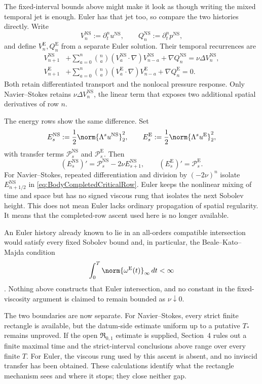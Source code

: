 The fixed-interval bounds above might make it look as though writing the mixed temporal
jet is enough.  Euler has that jet too, so compare the two histories directly.  Write
\[
  V_n^{\mathrm{NS}}:=\partial_t^nu^{\mathrm{NS}},
  \qquad
  Q_n^{\mathrm{NS}}:=\partial_t^np^{\mathrm{NS}},
\]
and define \(V_n^{\mathrm E},Q_n^{\mathrm E}\) from a separate Euler solution.  Their
temporal recurrences are
\begin{align}
  V_{n+1}^{\mathrm{NS}}
  &+
  \sum_{a=0}^{n}\binom{n}{a}
  (V_a^{\mathrm{NS}}\cdot\nabla)V_{n-a}^{\mathrm{NS}}
  +\nabla Q_n^{\mathrm{NS}}
  =\nu\Delta V_n^{\mathrm{NS}},
  \label{eq:NSTemporalRecurrenceComparison}
  \\
  V_{n+1}^{\mathrm E}
  &+
  \sum_{a=0}^{n}\binom{n}{a}
  (V_a^{\mathrm E}\cdot\nabla)V_{n-a}^{\mathrm E}
  +\nabla Q_n^{\mathrm E}
  =0.
  \label{eq:EulerTemporalRecurrenceComparison}
\end{align}
Both retain differentiated transport and the nonlocal pressure response.  Only
Navier--Stokes retains \(\nu\Delta V_n^{\mathrm{NS}}\), the linear term that exposes two
additional spatial derivatives of row \(n\).

The energy rows show the same difference.  Set
\[
  E_s^{\mathrm{NS}}:=\frac12\norm{\Lambda^su^{\mathrm{NS}}}_2^2,
  \qquad
  E_s^{\mathrm E}:=\frac12\norm{\Lambda^su^{\mathrm E}}_2^2,
\]
with transfer terms \(\mathcal P_s^{\mathrm{NS}}\) and \(\mathcal P_s^{\mathrm E}\).
Then
\begin{equation}\label{eq:NSEulerEnergyComparison}
  (E_s^{\mathrm{NS}})'
  =\mathcal P_s^{\mathrm{NS}}-2\nu E_{s+1}^{\mathrm{NS}},
  \qquad
  (E_s^{\mathrm E})'
  =\mathcal P_s^{\mathrm E}.
\end{equation}
For Navier--Stokes, repeated differentiation and division by \((-2\nu)^n\) isolate
\(E_{n+1/2}^{\mathrm{NS}}\) in \eqref{eq:BodyCompletedCriticalRow}.  Euler keeps the
nonlinear mixing of time and space but has no signed viscous rung that isolates the next
Sobolev height.  This does not mean Euler lacks ordinary propagation of spatial
regularity.  It means that the completed-row ascent used here is no longer available.

An Euler history already known to lie in an all-orders compatible intersection would
satisfy every fixed Sobolev bound and, in particular, the Beale--Kato--Majda condition
\[
  \int_0^T\norm{\omega^{\mathrm E}(t)}_\infty\,dt<\infty
\]
\parencite{BealeKatoMajda1984}.  Nothing above constructs that Euler intersection, and
no constant in the fixed-viscosity argument is claimed to remain bounded as
\(\nu\downarrow0\).

The two boundaries are now separate.  For Navier--Stokes, every strict finite rectangle
is available, but the datum-side estimate uniform up to a putative \(T_*\) remains
unproved.  If the open \(\mathfrak R_{0,1}\) estimate is supplied, Section~4 rules out a
finite maximal time and the strict-interval conclusions above range over every finite
\(T\).  For Euler, the viscous rung used by this ascent is absent, and no inviscid
transfer has been obtained.  These calculations identify what the rectangle mechanism
sees and where it stops; they close neither gap.
